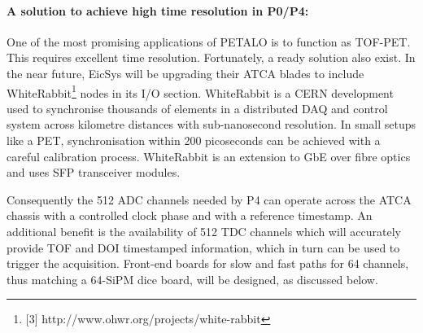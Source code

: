 \paragraph{A solution to achieve high time resolution in P0/P4:}
%
One of the most promising applications of PETALO is to function as TOF-PET. This requires excellent time resolution. Fortunately, a ready solution also exist. In the near future, EicSys will be upgrading their ATCA blades to include WhiteRabbit\footnote{[3] http://www.ohwr.org/projects/white-rabbit} nodes in its I/O section. WhiteRabbit is a CERN development used to synchronise thousands of elements in a distributed DAQ and control system across kilometre distances with sub-nanosecond resolution. In small setups like a PET, synchronisation within 200 picoseconds can be achieved with a careful calibration process. WhiteRabbit is an extension to GbE over fibre optics and uses SFP transceiver modules.
%
%
%

Consequently the 512 ADC channels needed by P4 can operate across the ATCA chassis with a controlled clock phase and with a reference timestamp. An additional benefit is the availability of 512 TDC channels which will accurately provide TOF and DOI timestamped information, which in turn can be used to trigger the acquisition. Front-end boards for slow and fast paths for 64 channels, thus matching a 64-SiPM dice board, will be designed, as discussed below.
%
%
